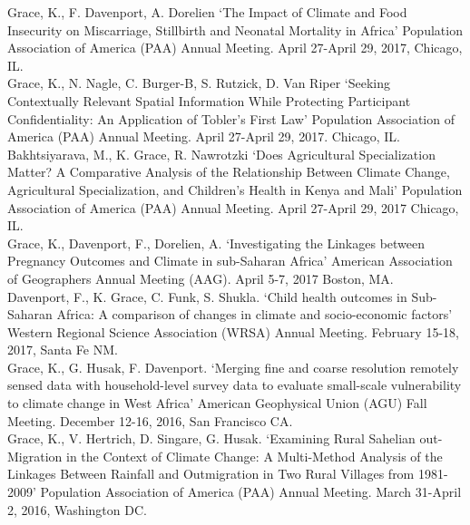 \documentclass[11pt]{article} %
\begin{document}
\noindent
Grace, K.,  F. Davenport, A. Dorelien `The Impact of Climate and Food Insecurity on Miscarriage,
Stillbirth and Neonatal Mortality in Africa' Population Association of America (PAA) Annual Meeting.
April 27-April 29, 2017, Chicago, IL.\\

\noindent
Grace, K., N. Nagle, C. Burger-B, S. Rutzick, D. Van Riper `Seeking Contextually Relevant Spatial
Information While Protecting Participant Confidentiality: An Application of Tobler's First Law'
Population Association of America (PAA) Annual Meeting. April 27-April 29, 2017. Chicago, IL.\\

\noindent
Bakhtsiyarava, M.,  K. Grace, R. Nawrotzki `Does Agricultural Specialization Matter? A Comparative
Analysis of the Relationship Between Climate Change, Agricultural Specialization, and Children's Health
in Kenya and Mali' Population Association of America (PAA) Annual Meeting. April 27-April 29, 2017
Chicago, IL.\\

\noindent
Grace, K., Davenport, F., Dorelien, A. `Investigating the Linkages between Pregnancy Outcomes and Climate in sub-Saharan Africa' American Association of Geographers Annual Meeting  (AAG).  April 5-7, 2017 Boston, MA. \\



\noindent
Davenport, F., K. Grace, C. Funk, S. Shukla. `Child health outcomes in Sub-Saharan Africa: A comparison of changes in climate and socio-economic factors' Western Regional Science Association (WRSA) Annual Meeting. February 15-18, 2017, Santa Fe NM.\\


\noindent
Grace, K.,  G. Husak, F. Davenport. `Merging fine and coarse resolution remotely sensed data with household-level survey data to evaluate small-scale vulnerability to climate change in West Africa'  American Geophysical Union (AGU) Fall Meeting.  December 12-16, 2016, San Francisco CA.\\ 

\noindent
Grace, K., V. Hertrich, D. Singare, G. Husak. `Examining Rural Sahelian out-Migration in the Context of Climate Change: A Multi-Method Analysis of the Linkages Between Rainfall and Outmigration in Two Rural Villages from 1981-2009' Population Association of America (PAA) Annual Meeting. March 31-April 2, 2016, Washington DC.\\
\end{document}

